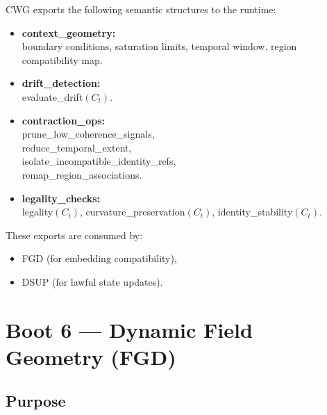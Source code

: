 CWG exports the following semantic structures to the runtime:

\begin{itemize}[leftmargin=1.2cm]

    \item \textbf{context\_geometry:}\\
    \hangindent=1.2cm boundary conditions, saturation limits, temporal window,
    region compatibility map.

    \item \textbf{drift\_detection:}\\
    \hangindent=1.2cm evaluate\_drift$(C_t)$.

    \item \textbf{contraction\_ops:}\\
    \hangindent=1.2cm prune\_low\_coherence\_signals,\\
    \hangindent=1.2cm reduce\_temporal\_extent,\\
    \hangindent=1.2cm isolate\_incompatible\_identity\_refs,\\
    \hangindent=1.2cm remap\_region\_associations.

    \item \textbf{legality\_checks:}\\
    \hangindent=1.2cm legality$(C_t)$, curvature\_preservation$(C_t)$,
    identity\_stability$(C_t)$.

\end{itemize}

These exports are consumed by:
\begin{itemize}[leftmargin=1.2cm]
    \item FGD (for embedding compatibility),
    \item DSUP (for lawful state updates).
\end{itemize}



\section*{Boot 6 — Dynamic Field Geometry (FGD)}
\label{boot:dynamic_field_geometry}

\subsection*{Purpose}


